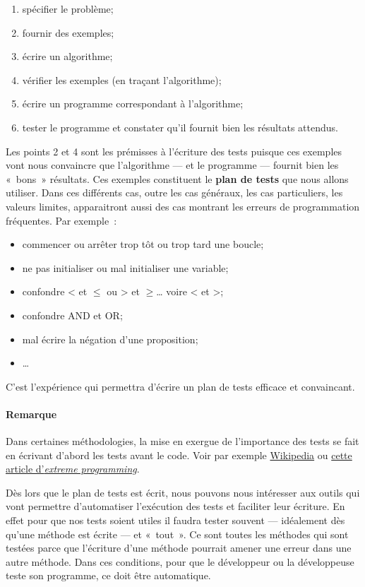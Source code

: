 \begin{enumerate}
	\item spécifier le problème;
	\item fournir des exemples;
	\item écrire un algorithme;
	\item vérifier les exemples (en traçant l'algorithme);
	\item écrire un programme correspondant à l'algorithme;
	\item tester le programme et constater qu'il fournit bien les résultats attendus.
\end{enumerate}

Les points 2 et 4 sont les prémisses à l'écriture des tests puisque ces exemples
vont nous convaincre que l'algorithme — et le programme — fournit bien les
«~bons~» résultats. Ces exemples constituent le \textbf{plan de tests} que nous allons utiliser. Dans ces différents cas, outre les cas généraux, les cas particuliers, les valeurs limites, apparaitront aussi des cas montrant les erreurs de programmation fréquentes. Par exemple~:

\begin{itemize}
	\item commencer ou arrêter trop tôt ou trop tard une boucle;
	\item ne pas initialiser ou mal initialiser une variable;
	\item confondre < et $\le$ ou > et $\ge$… voire < et >;
	\item confondre AND et OR;
	\item mal écrire la négation d'une proposition;
	\item …
\end{itemize}

C'est l'expérience qui permettra d'écrire un plan de tests efficace et
convaincant.

\paragraph{Remarque} Dans certaines méthodologies, la mise en exergue de l'importance des tests se fait en écrivant d'abord les tests avant le code.
Voir par exemple \href{https://fr.wikipedia.org/wiki/Test_driven_development}{Wikipedia} ou \href{http://www.extremeprogramming.org/rules/testfirst.html}{cette article d'\textit{extreme programming}}. 

Dès lors que le plan de tests est écrit, nous pouvons nous intéresser aux outils
qui vont permettre d'automatiser l'exécution des tests et faciliter leur
écriture.  En effet pour que nos tests soient utiles il faudra tester souvent
— idéalement dès qu'une méthode est écrite — et «~tout~». Ce sont toutes les
méthodes qui sont testées parce que l'écriture d'une méthode pourrait amener une
erreur dans une autre méthode. Dans ces conditions, pour que le développeur ou
la développeuse teste son programme, ce doit être automatique.  

